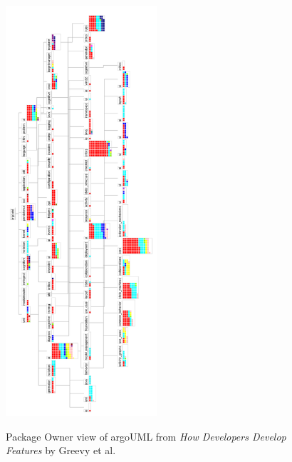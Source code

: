 \begin{figure}[H]
\centering
\includegraphics[width=0.5\textwidth]{./resources/annex_package_owner.png}~
\caption{Package Owner view of argoUML from \emph{How Developers Develop Features}\cite{Girba2007} by Greevy et al.}
\label{fig:annex_package_owner}
\end{figure}

